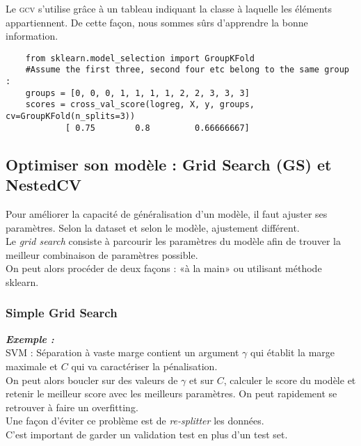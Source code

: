 \documentclass[a4paper,12pt]{report}
\newcommand\bk{\color{black}}
\newcommand\brick{\color{brick}}
\numberwithin{equation}{section} %
\begin{document}
\noindent Le \textsc{gcv} s'utilise grâce à un tableau indiquant la classe à laquelle les éléments appartiennent. De cette façon, nous sommes sûrs d'apprendre la bonne information.
\begin{lstlisting}
	from sklearn.model_selection import GroupKFold	
	#Assume the first three, second four etc belong to the same group :
	groups = [0, 0, 0, 1, 1, 1, 1, 2, 2, 3, 3, 3]
	scores = cross_val_score(logreg, X, y, groups, cv=GroupKFold(n_splits=3))
			[ 0.75        0.8         0.66666667]\end{lstlisting}

\brick \subsection{Optimiser son modèle : Grid Search (GS) et NestedCV} \bk
Pour améliorer la capacité de généralisation d'un modèle, il faut ajuster ses paramètres. Selon la dataset et selon le modèle, ajustement différent.\\
Le \textit{grid search} consiste à parcourir les paramètres du modèle afin de trouver la meilleur combinaison de paramètres possible. \\
On peut alors procéder de deux façons : «à la main» ou utilisant méthode sklearn.
\subsubsection{Simple Grid Search}
\noindent \color{green!40!black!70} \textbf{\textit{Exemple :}} \bk \\
SVM : Séparation à vaste marge contient un argument $\gamma$ qui établit la marge maximale et $C$ qui va caractériser la pénalisation.\\
On peut alors boucler sur des valeurs de $\gamma$ et sur $C$, calculer le score du modèle et retenir le meilleur score avec les meilleurs paramètres. On peut rapidement se retrouver à faire un overfitting.\\
Une façon d'éviter ce problème est de \textit{re-splitter} les données. \\
C'est important de garder un validation test en plus d'un test set.\\
\end{document}
